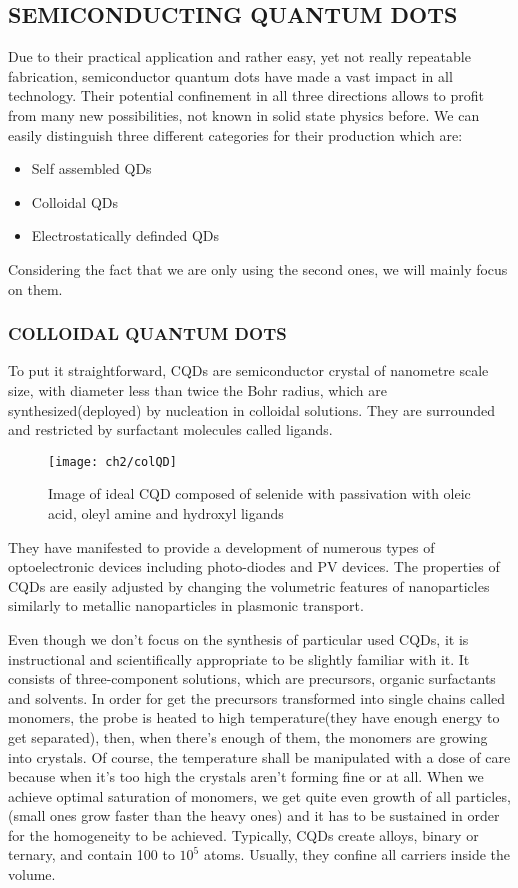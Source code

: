 \subsection{SEMICONDUCTING QUANTUM DOTS}

Due to their practical application and rather easy, yet not really repeatable fabrication, semiconductor quantum dots have made a vast impact in all technology. Their potential confinement in all three directions allows to profit from many new possibilities, not known in solid state physics before.
We can easily distinguish three different categories for their production which are:
\begin{itemize}
\item Self assembled QDs
\item Colloidal QDs
\item Electrostatically definded QDs 
\end{itemize}
Considering the fact that we are only using the second ones, we will mainly focus on them. 

\subsubsection{COLLOIDAL QUANTUM DOTS}
To put it straightforward, CQDs are semiconductor crystal of nanometre scale size, with diameter less than twice the Bohr radius, which are synthesized(deployed) by nucleation in colloidal solutions. They are surrounded and restricted by surfactant molecules called ligands. 

\begin{figure}[H]
\centering
\texttt{[image: ch2/colQD]}

\caption{Image of ideal CQD composed of selenide with passivation with oleic acid, oleyl amine and hydroxyl ligands \cite{qd}}
\end{figure}

\noindent They have manifested to provide a development of numerous types of optoelectronic devices including photo-diodes and PV devices. The properties of CQDs are easily adjusted by changing the volumetric features of nanoparticles similarly to metallic nanoparticles in plasmonic transport. \cite{Abdelhady2015} \cite{G.D.Scholes2003}

\noindent Even though we don't focus on the synthesis of particular used CQDs, it is instructional and scientifically appropriate to be slightly familiar with it. It consists of three-component solutions, which are precursors, organic surfactants and solvents. In order for get the precursors transformed into single chains called monomers, the probe is heated to high temperature(they have enough energy to get separated), then, when there's enough of them, the monomers are growing into crystals. Of course, the temperature shall be manipulated with a dose of care because when it's too high the crystals aren't forming fine or at all. When we achieve optimal saturation of monomers, we get quite even growth of all particles, (small ones grow faster than the heavy ones) and it has to be sustained in order for the homogeneity to be achieved.
Typically, CQDs create alloys, binary or ternary, and contain 100 to $10^5$ atoms. Usually, they confine all carriers inside the volume.
